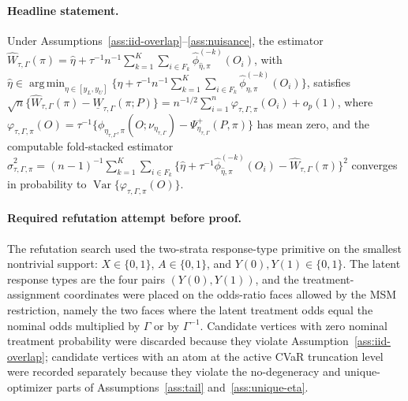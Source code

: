 \begin{proposition}\label{prop:onestep-limit}\label{conj:onestep-limit}
\paragraph{Headline statement.}
Under Assumptions~\ref{ass:iid-overlap}--\ref{ass:nuisance}, the estimator \(\widehat W_{\tau,\Gamma}(\pi)=\widehat\eta+\tau^{-1}n^{-1}\sum_{k=1}^K\sum_{i\in F_k}\widehat\phi_{\widehat\eta,\pi}^{(-k)}(O_i)\), with \(\widehat\eta\in\operatorname*{arg\,min}_{\eta\in[y_L,y_U]}\{\eta+\tau^{-1}n^{-1}\sum_{k=1}^K\sum_{i\in F_k}\widehat\phi_{\eta,\pi}^{(-k)}(O_i)\}\), satisfies \(\sqrt n\{\widehat W_{\tau,\Gamma}(\pi)-\underline W_{\tau,\Gamma}(\pi;P)\}=n^{-1/2}\sum_{i=1}^n\varphi_{\tau,\Gamma,\pi}(O_i)+o_p(1)\), where \(\varphi_{\tau,\Gamma,\pi}(O)=\tau^{-1}\{\phi_{\eta_{\tau,\Gamma},\pi}(O;\nu_{\eta_{\tau,\Gamma}})-\Psi_{\eta_{\tau,\Gamma}}^{+}(P,\pi)\}\) has mean zero, and the computable fold-stacked estimator \(\widehat\sigma_{\tau,\Gamma,\pi}^2=(n-1)^{-1}\sum_{k=1}^K\sum_{i\in F_k}\{\widehat\eta+\tau^{-1}\widehat\phi_{\widehat\eta,\pi}^{(-k)}(O_i)-\widehat W_{\tau,\Gamma}(\pi)\}^2\) converges in probability to \(\operatorname{Var}\{\varphi_{\tau,\Gamma,\pi}(O)\}\).
\end{proposition}

\paragraph{Required refutation attempt before proof.}
The refutation search used the two-strata response-type primitive on the smallest nontrivial support:
\(X\in\{0,1\}\), \(A\in\{0,1\}\), and \(Y(0),Y(1)\in\{0,1\}\).  The latent response types are the four
pairs \((Y(0),Y(1))\), and the treatment-assignment coordinates were placed on the odds-ratio faces allowed by the MSM restriction, namely the two faces where the latent treatment odds equal the nominal odds multiplied by \(\Gamma\) or by \(\Gamma^{-1}\).  Candidate vertices with zero nominal treatment probability were discarded because they violate Assumption~\ref{ass:iid-overlap}; candidate vertices with an atom at the active CVaR truncation level were recorded separately because they violate the no-degeneracy and unique-optimizer parts of Assumptions~\ref{ass:tail} and~\ref{ass:unique-eta}.

